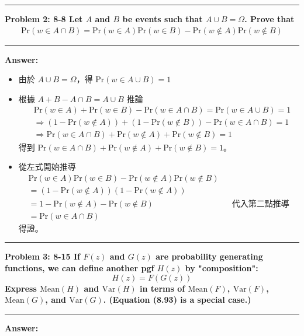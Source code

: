 \documentclass[11pt,fleqn]{article}
\newcommand\question[2]{\vspace{.25in}\hrule\textbf{#1: #2}\vspace{.5em}\hrule\vspace{.10in}}
\renewcommand\part[1]{\vspace{.10in}\textbf{#1}}
\begin{document}
\question{Problem 2}{8-8 Let $A$ and $B$ be events such that $A \cup B = \Omega$. 
	Prove that
	\begin{align*}
		\text{Pr}(w \in A \cap B) = \text{Pr}(w \in A) \text{Pr}(w \in B) -
			\text{Pr}(w \notin A)\text{Pr}(w \notin B)
	\end{align*}
}

\part{Answer:}

\begin{itemize}
	\item 由於 $A \cup B = \Omega$，得 $\text{Pr}(w \in A \cup B) = 1$
	\item 根據 $A + B - A \cap B = A \cup B$ 推論
		\begin{align*}
		& \text{Pr}(w \in A) + \text{Pr}(w \in B) - \text{Pr}(w \in A \cap B) 
			= \text{Pr}(w \in A \cup B) = 1 \\
		& \Rightarrow (1 - \text{Pr}(w \notin A)) + (1 - \text{Pr}(w \notin B)) 
			- \text{Pr}(w \in A \cap B) = 1 \\
		& \Rightarrow \text{Pr}(w \in A \cap B) + \text{Pr}(w \notin A) 
			+ \text{Pr}(w \notin B) = 1
		\end{align*}
		得到 $\text{Pr}(w \in A \cap B) + \text{Pr}(w \notin A) + \text{Pr}(w \notin B) = 1$。
	\item 從左式開始推導
		\begin{align*}
		&\text{Pr}(w \in A) \text{Pr}(w \in B) -
			\text{Pr}(w \notin A)\text{Pr}(w \notin B) \\
		&= \left( 1 - \text{Pr}(w \notin A)\right)\left( 1 - \text{Pr}(w \notin A)\right) \\
		&= 1 - \text{Pr}(w \notin A) - \text{Pr}(w \notin B) 
			&& \text{代入第二點推導的結果} \\
		&= \text{Pr}(w \in A \cap B)
		\end{align*}
		得證。
\end{itemize}

\question{Problem 3}{8-15 If $F(z)$ and $G(z)$ are probability generating functions, 
	we can define another pgf $H(z)$ by "composition":
	$$H(z) = F(G(z))$$
	Express $\text{Mean}(H)$ and $\text{Var}(H)$ in terms of $\text{Mean}(F)$, $\text{Var}(F)$, 
	$\text{Mean}(G)$, and $\text{Var}(G)$. (Equation (8.93) is a special case.)
}

\part{Answer:}
\end{document}
